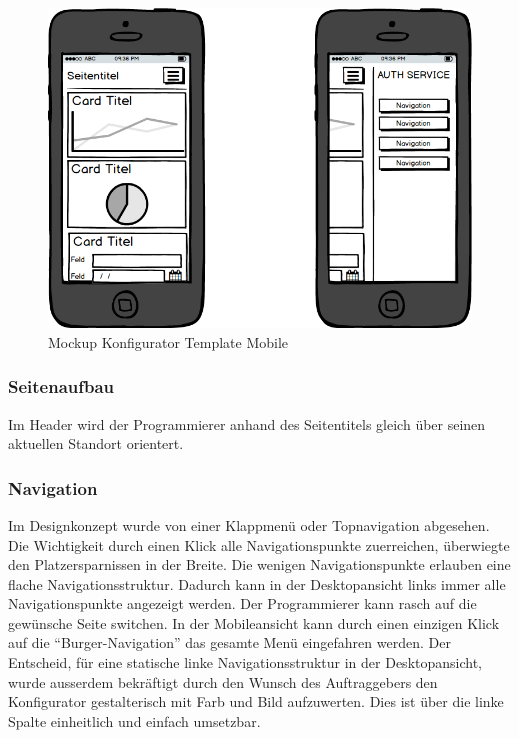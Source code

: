 \begin{figure}[htbp]
\centering
\includegraphics{images/mockups/Mobile.png}
\caption{Mockup Konfigurator Template Mobile}
\end{figure}

\subsubsection{Seitenaufbau}\label{seitenaufbau}

Im Header wird der Programmierer anhand des Seitentitels gleich über
seinen aktuellen Standort orientert.

\subsubsection{Navigation}\label{navigation}

Im Designkonzept wurde von einer Klappmenü oder Topnavigation abgesehen.
Die Wichtigkeit durch einen Klick alle Navigationspunkte zuerreichen,
überwiegte den Platzersparnissen in der Breite. Die wenigen
Navigationspunkte erlauben eine flache Navigationsstruktur. Dadurch kann
in der Desktopansicht links immer alle Navigationspunkte angezeigt
werden. Der Programmierer kann rasch auf die gewünsche Seite switchen.
In der Mobileansicht kann durch einen einzigen Klick auf die
``Burger-Navigation'' das gesamte Menü eingefahren werden. Der
Entscheid, für eine statische linke Navigationsstruktur in der
Desktopansicht, wurde ausserdem bekräftigt durch den Wunsch des
Auftraggebers den Konfigurator gestalterisch mit Farb und Bild
aufzuwerten. Dies ist über die linke Spalte einheitlich und einfach
umsetzbar.

